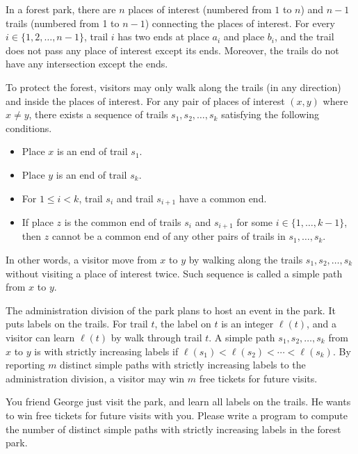 In a forest park, there are $n$ places of interest (numbered from $1$ to $n$)
and $n-1$ trails (numbered from 1 to $n-1$) connecting the places of interest. 
For every $i\in\{1,2,\dots,n-1\}$, trail $i$ has two ends at place $a_i$ and 
place $b_i$, and the trail does not pass any place of interest except its ends. 
Moreover, the trails do not have any intersection except the ends.

To protect the forest, visitors may only walk along the trails 
(in any direction)
and inside the places of interest. For any pair of places
of interest $(x, y)$ where $x\neq y$, 
there exists a sequence of trails $s_1,s_2,\dots,s_k$
satisfying the following conditions.
\begin{itemize}
\item Place $x$ is an end of trail $s_1$.
\item Place $y$ is an end of trail $s_k$.
\item For $1\le i < k$, trail $s_i$ and trail $s_{i+1}$ have a common end.
\item If place $z$ is the common end of trails $s_i$ and $s_{i+1}$ for some
$i\in\{1,\dots,k-1\}$, then $z$ cannot be a common end of any other pairs of 
trails in $s_1,\dots,s_k$.
\end{itemize}
In other words, a visitor move from $x$ to $y$ by walking along the trails
$s_1,s_2,\dots,s_k$ without visiting a place of interest twice. 
Such sequence is called a simple path from $x$ to $y$.

The administration division of the park plans to host an event in the park.
It puts labels on the trails. For trail $t$, the label on $t$ is an
integer $\ell(t)$, and a visitor can learn $\ell(t)$ by walk through 
trail $t$.
A simple path $s_1,s_2,\dots,s_k$ from $x$ to $y$ is 
with strictly increasing labels if $\ell(s_1)<\ell(s_2)<\cdots<\ell(s_k)$.
By reporting $m$ distinct simple paths with 
strictly increasing labels to the administration division, 
a visitor may win $m$ free tickets for future visits.

You friend George just visit the park, and learn all labels on the trails.
He wants to win free tickets for future visits with you.
Please write a program to compute the number of distinct simple paths 
with strictly increasing labels in
the forest park.

